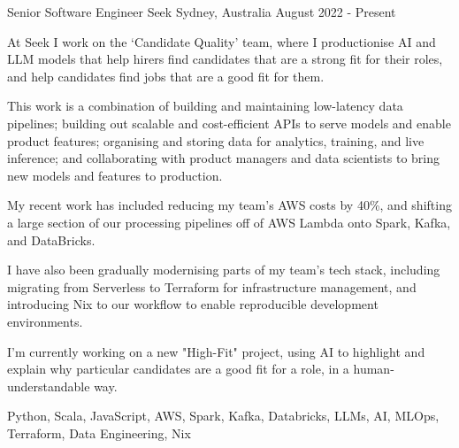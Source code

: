 


\vspace{-2.0mm}

\begin{cventries}


\cventry
{Senior Software Engineer} %
{Seek} %
{Sydney, Australia} %
{August 2022 - Present} %
{ %
\begin{cvitems}
  \item {At Seek I work on the `Candidate Quality' team, where I productionise AI and LLM models that help hirers find candidates that are a strong fit for their roles, and help candidates find jobs that are a good fit for them.}
  \item {This work is a combination of building and maintaining low-latency data pipelines; building out scalable and cost-efficient APIs to serve models and enable product features; organising and storing data for analytics, training, and live inference; and collaborating with product managers and data scientists to bring new models and features to production.}
  \item {My recent work has included reducing my team's AWS costs by 40\%, and shifting a large section of our processing pipelines off of AWS Lambda onto Spark, Kafka, and DataBricks.}
  \item {I have also been gradually modernising parts of my team's tech stack, including migrating from Serverless to Terraform for infrastructure management, and introducing Nix to our workflow to enable reproducible development environments. }
  \item {I'm currently working on a new "High-Fit" project, using AI to highlight and explain why particular candidates are a good fit for a role, in a human-understandable way.}
\end{cvitems}
}
{Python, Scala, JavaScript, AWS, Spark, Kafka, Databricks, LLMs, AI, MLOps, Terraform, Data Engineering, Nix}


\end{cventries}
